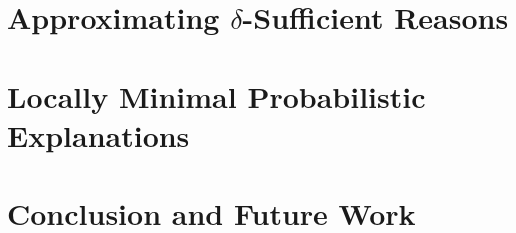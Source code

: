 \documentclass[letterpaper]{article} %
\begin{document}
\section{Approximating $\delta$-Sufficient Reasons}
\label{sec-comp-problem}


\section{Locally Minimal Probabilistic Explanations}
\label{sec-loc-min}


\section{Conclusion and Future Work}
\label{sec-conclusions}





% 
\end{document}

